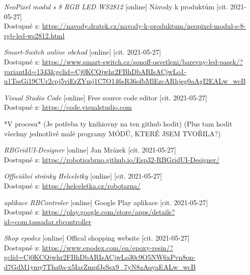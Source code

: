 \begin{thebibliography}{99}
\textit{NeoPixel modul s 8 RGB LED WS2812} [online] Návody k produktům [cit. 2021-05-27] \\
Dostupné z: \url{https://navody.dratek.cz/navody-k-produktum/neopixel-modul-s-8-rgb-led-ws2812.html}



\textit{Smart-Switch online obchod} [online]  [cit. 2021-05-27] \\
Dostupné z: \url{https://www.smart-switch.cz/sonoff-osvetleni/barevny-led-pasek/?variantId=1343&gclid=Cj0KCQjwhr2FBhDbARIsACjwLo1-u1TssGi19CUr2cpj5viErZYmj1C7O146sR36ofbMlEzcARhjeg0aAgI2EALw_wcB}

\textit{Visual Studio Code} [online] Free source code editor [cit. 2021-05-27] \\
Dostupné z: \url{https://code.visualstudio.com} 

*V procesu* (Je potřeba ty knihiovny na ten github hodit)
(Plus tam hodit všechny jednotlivé malé programy MÓDŮ, KTERÉ JSEM TVOŘILA?)

\textit{RBGridUI-Designer} [online] Jan Mrázek [cit. 2021-05-27] \\
Dostupné z: \url{https://roboticsbrno.github.io/Esp32-RBGridUI-Designer/} 

\textit{Officiální stránky Helceletky} [online]  [cit. 2021-05-27] \\
Dostupné z: \url{https://helceletka.cz/robotarna/}

\textit{aplikace RBControler} [online] Google Play aplikace [cit. 2021-05-27] \\
Dostupné z: \url{https://play.google.com/store/apps/details?id=com.tassadar.rbcontroller}

\textit{Shop epodex} [online] Offical shopping website [cit. 2021-05-27] \\
Dostupné z: \url{https://www.epodex.com/en/epoxy-resin/?gclid=Cj0KCQjwhr2FBhDbARIsACjwLo30c9O5NW6xPvn8on-d7GdM1ymy7Tha0a-x5IarZmqfJsSsx9_7yN8aAqyaEALw_wcB}

\end{thebibliography}
